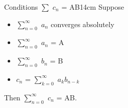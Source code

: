     \vspace{0.5cm}



    \begin{wtheorem}{Conditions $\sum$ $c_n$ = AB}{14cm}
        Suppose

        \begin{itemize}[leftmargin=1cm, itemsep=0.1cm]
            \item $\sum_{n=0}^{\infty}$ $a_n$ converges absolutely
            
            \item $\sum_{n=0}^{\infty}$ $a_n$ = A
            
            \item $\sum_{n=0}^{\infty}$ $b_n$ = B
            
            \item $c_n$ = $\sum_{k=0}^{\infty}$ $a_k b_{n-k}$ 
        \end{itemize}

        Then $\sum_{n=0}^{\infty}$ $c_n$ = AB.
    \end{wtheorem}

